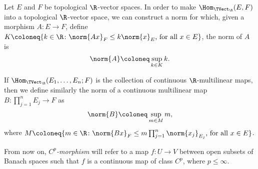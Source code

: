 \begin{definition}
\label{def:norm-morphism-TopVect}
Let \(E\) and \(F\) be topological \(\R\)-vector spaces. In order to make
\(\Hom_{\TVect_{\R}}(E, F)\) into a topological \(\R\)-vector space, we can
construct a norm for which, given a morphism \(A: E \to F\), define \(K \coloneq
\{k \in \R \colon \norm{Ax}_{F} \leq k \norm{x}_E \text{, for all } x \in E\}\), the
norm of \(A\) is
\[
  \norm{A} \coloneq \sup_{k \in K} k.
\]

If \(\Hom_{\TVect_{\R}}(E_1, \dots, E_n; F)\) is the collection of continuous
\(\R\)-multilinear maps, then we define similarly the norm of a continuous
multilinear map \(B: \prod_{j=1}^n E_j \to F\) as
\[
  \norm{B} \coloneq \sup_{m \in M} m,
\]
where \(M \coloneq \{m \in \R \colon \norm{Bx}_F \leq m \prod_{j=1}^n
\norm{x_j}_{E_j} \text{, for all } x \in E\}\).
\end{definition}

\begin{remark}
\label{rm:Cp-morphism}
From now on, \emph{\(C^p\)-morphism} will refer to a map \(f: U \to V\) between
open subsets of Banach spaces such that \(f\) is a continuous map of class
\(C^p\), where \(p \leq \infty\).
\end{remark}

